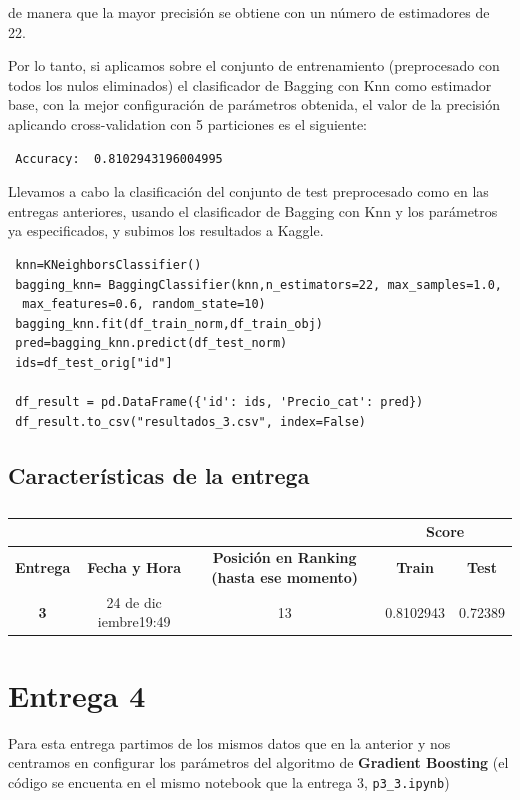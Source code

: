 \documentclass[a4paper,11pt]{article}
\begin{document}
 de manera que la mayor precisión se obtiene con un número de estimadores de 22. 
 
 Por lo tanto, si aplicamos sobre el conjunto de entrenamiento (preprocesado con todos los nulos eliminados) el clasificador de Bagging con Knn como estimador base, con la mejor configuración de parámetros obtenida, el valor de la precisión aplicando cross-validation con 5 particiones es el siguiente:
 \begin{verbatim}
 Accuracy:  0.8102943196004995
 \end{verbatim}

 Llevamos a cabo la clasificación del conjunto de test preprocesado como en las entregas anteriores, usando el clasificador de Bagging con Knn y los parámetros ya especificados, y subimos los resultados a Kaggle. 
 
 \begin{verbatim}
 knn=KNeighborsClassifier()
 bagging_knn= BaggingClassifier(knn,n_estimators=22, max_samples=1.0,
  max_features=0.6, random_state=10)
 bagging_knn.fit(df_train_norm,df_train_obj)
 pred=bagging_knn.predict(df_test_norm)
 ids=df_test_orig["id"]
 
 df_result = pd.DataFrame({'id': ids, 'Precio_cat': pred})
 df_result.to_csv("resultados_3.csv", index=False)
 \end{verbatim}
 
 \subsection{Características de la entrega}

 \begin{table}[htbp]
 	\caption{}
 	\begin{tabular}{|c|c|c|c|c|}
 		\hline
 		\multicolumn{1}{|l|}{} & \textbf{} & \textbf{} & \multicolumn{ 2}{c|}{\textbf{Score}} \\ \hline
 		\textbf{Entrega} & \textbf{Fecha y Hora} & \textbf{Posición en Ranking (hasta ese momento)} & \textbf{Train} & \textbf{Test} \\ \hline
 		\textbf{3} & 24  de dic iembre19:49 & 13 & 0.8102943 & 0.72389 \\ \hline
 	\end{tabular}
 	\label{}
 \end{table}
 
 \section{Entrega 4}
 Para esta entrega partimos de los mismos datos que en la anterior y nos centramos en configurar los parámetros del algoritmo de \textbf{Gradient Boosting} (el código se encuenta en el mismo notebook que la entrega 3, \texttt{p3_3.ipynb})
\end{document}
